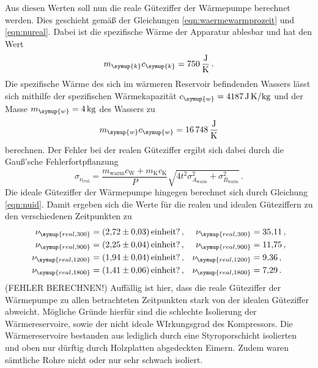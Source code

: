 Aus diesen Werten soll nun die reale Güteziffer der Wärmepumpe berechnet werden. Dies geschieht gemäß der Gleichungen
\ref{eqn:waermewarmprozeit} und \ref{eqn:nureal}. Dabei ist die spezifische Wärme
der Apparatur ablesbar und hat den Wert
\begin{equation}
  m_{\symup{k}}c_{\symup{k}}=\SI{750}{\joule\per\kelvin} \,. \nonumber
\end{equation}
Die spezifische Wärme des sich im wärmeren Reservoir befindenden Wassers lässt sich
mithilfe der spezifischen Wärmekapazität $c_{\symup{w}}=\SI{4187}{\joule\per\kilo\gram\kelvin}$
und der Masse $m_{\symup{w}}=\SI{4}{\kilo\gram}$ des Wassers zu
\begin{equation}
  m_{\symup{w}}c_{\symup{w}}=\SI{16748}{\joule\per\kelvin}  \nonumber
\end{equation}
berechnen.
Der Fehler bei der realen Güteziffer ergibt sich dabei durch die Gauß'sche Fehlerfortpflanzung
\begin{equation}
  \sigma_{\nu_\text{real}} = \frac{m_\text{warm} c_\text{W} + m_\text{K} c_\text{K}}{P}
  \sqrt{4 t^2 \sigma_{A_\text{warm}}^2 + \sigma_{B_\text{warm}}^2} \,.
\end{equation}
Die ideale Güteziffer der Wärmepumpe hingegen berechnet sich durch Gleichung
\ref{eqn:nuid}. Damit ergeben sich die Werte für die realen und idealen
Güteziffern zu den verschiedenen Zeitpunkten zu
\begin{align*}
  \nu_{\symup{real, 300}} &= \SI{2.72(003)}{einheit?} \,, & \nu_{\symup{real, 300}} &= \SI{35.11}{...}  \,,\\
  \nu_{\symup{real, 900}} &= \SI{2.25(004)}{einheit?} \,, & \nu_{\symup{real, 900}} &= \SI{11.75}{}  \,,\\
  \nu_{\symup{real, 1200}} &= \SI{1.94(004)}{einheit?} \,,& \nu_{\symup{real, 1200}} &= \SI{9.36}{}  \,,\\
  \nu_{\symup{real, 1800}} &=  \SI{1.41(006)}{einheit?}\,,& \nu_{\symup{real, 1800}} &= \SI{7.29}{}  \,.\\
\end{align*}
(FEHLER BERECHNEN!)
Auffällig ist hier, dass die reale Güteziffer der Wärmepumpe zu allen betrachteten
Zeitpunkten stark von der idealen Güteziffer abweicht.
Mögliche Gründe hierfür sind die schlechte Isolierung der Wärmereservoire, sowie
der nicht ideale WIrkungsgrad des Kompressors. Die Wärmereservoire bestanden
aus lediglich durch eine Styroporschicht isolierten und oben nur dürftig durch Holzplatten
abgedeckten Eimern. Zudem waren sämtliche Rohre nicht oder nur sehr schwach isoliert.





